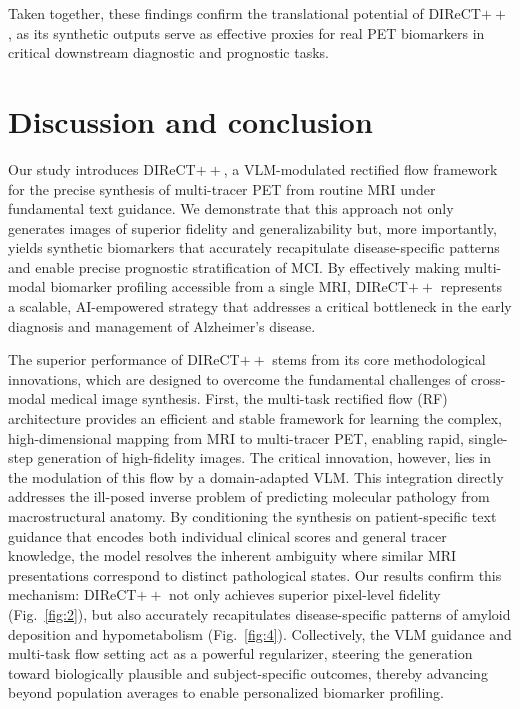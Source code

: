 \documentclass[a4paper]{cas-sc}
\begin{document}
Taken together, these findings confirm the translational potential of DIReCT$++$, as its synthetic outputs serve as effective proxies for real PET biomarkers in critical downstream diagnostic and prognostic tasks.


\section{Discussion and conclusion}\label{sec3}
Our study introduces DIReCT$++$, a VLM-modulated rectified flow framework for the precise synthesis of multi-tracer PET from routine MRI under fundamental text guidance. We demonstrate that this approach not only generates images of superior fidelity and generalizability but, more importantly, yields synthetic biomarkers that accurately recapitulate disease-specific patterns and enable precise prognostic stratification of MCI. By effectively making multi-modal biomarker profiling accessible from a single MRI, DIReCT$++$ represents a scalable, AI-empowered strategy that addresses a critical bottleneck in the early diagnosis and management of Alzheimer's disease.

The superior performance of DIReCT$++$ stems from its core methodological innovations, which are designed to overcome the fundamental challenges of cross-modal medical image synthesis. First, the multi-task rectified flow (RF) architecture provides an efficient and stable framework for learning the complex, high-dimensional mapping from MRI to multi-tracer PET, enabling rapid, single-step generation of high-fidelity images. The critical innovation, however, lies in the modulation of this flow by a domain-adapted VLM. This integration directly addresses the ill-posed inverse problem of predicting molecular pathology from macrostructural anatomy. By conditioning the synthesis on patient-specific text guidance that encodes both individual clinical scores and general tracer knowledge, the model resolves the inherent ambiguity where similar MRI presentations correspond to distinct pathological states. Our results confirm this mechanism: DIReCT$++$ not only achieves superior pixel-level fidelity (Fig.~\ref{fig:2}), but also accurately recapitulates disease-specific patterns of amyloid deposition and hypometabolism (Fig.~\ref{fig:4}). Collectively, the VLM guidance and multi-task flow setting act as a powerful regularizer, steering the generation toward biologically plausible and subject-specific outcomes, thereby advancing beyond population averages to enable personalized biomarker profiling.
\end{document}
